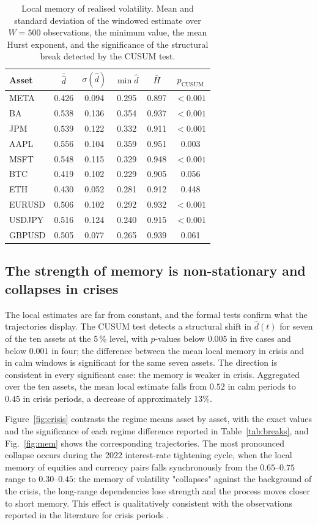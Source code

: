\documentclass[journal]{IEEEtran}
\begin{document}
\begin{table}[t]
\centering
\caption{Local memory of realised volatility. Mean and standard deviation of the windowed estimate
over $W=500$ observations, the minimum value, the mean Hurst exponent, and the significance of the
structural break detected by the CUSUM test.}
\label{tab:mem}
\begin{tabular}{lccccc}
\toprule
\textbf{Asset} & $\bar{\hat d}$ & $\sigma(\hat d)$ & $\min \hat d$ & $\bar H$ & $p_{\mathrm{CUSUM}}$ \\
\midrule
META   & 0.426 & 0.094 & 0.295 & 0.897 & $<0.001$ \\
BA     & 0.538 & 0.136 & 0.354 & 0.937 & $<0.001$ \\
JPM    & 0.539 & 0.122 & 0.332 & 0.911 & $<0.001$ \\
AAPL   & 0.556 & 0.104 & 0.359 & 0.951 & 0.003 \\
MSFT   & 0.548 & 0.115 & 0.329 & 0.948 & $<0.001$ \\
BTC    & 0.419 & 0.102 & 0.229 & 0.905 & 0.056 \\
ETH    & 0.430 & 0.052 & 0.281 & 0.912 & 0.448 \\
EURUSD & 0.506 & 0.102 & 0.292 & 0.932 & $<0.001$ \\
USDJPY & 0.516 & 0.124 & 0.240 & 0.915 & $<0.001$ \\
GBPUSD & 0.505 & 0.077 & 0.265 & 0.939 & 0.061 \\
\bottomrule
\end{tabular}
\end{table}

\subsection{The strength of memory is non-stationary and collapses in crises}

The local estimates are far from constant, and the formal tests confirm what the trajectories
display. The CUSUM test detects a structural shift in $\hat d(t)$ for seven of the ten assets at the
5\,\% level, with $p$-values below $0.005$ in five cases and below $0.001$ in four; the
difference between the mean local memory in crisis and in calm windows is significant for the
same seven assets. The direction is consistent in every significant case: the memory is weaker in
crisis. Aggregated over the ten assets, the mean local estimate falls from $0.52$ in calm periods
to $0.45$ in crisis periods, a decrease of approximately $13\%$.

Figure~\ref{fig:crisis} contrasts the regime means asset by asset, with the exact values
and the significance of each regime difference reported in Table~\ref{tab:breaks}, and
Fig.~\ref{fig:mem} shows the corresponding trajectories. The most pronounced collapse occurs during
the 2022 interest-rate tightening cycle, when the local memory of equities and currency pairs
falls synchronously from the $0.65$--$0.75$ range to $0.30$--$0.45$: the memory of volatility
"collapses" against the background of the crisis, the long-range dependencies lose strength and
the process moves closer to short memory. This effect is qualitatively consistent with the
observations reported in the literature for crisis periods \cite{vogl2023hurst,choi2025three}.
\end{document}
